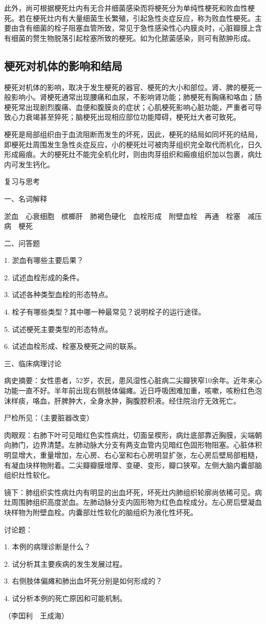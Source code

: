 此外，尚可根据梗死灶内有无合并细菌感染而将梗死分为单纯性梗死和败血性梗死。若在梗死灶内有大量细菌生长繁殖，引起急性炎症反应，称为败血性梗死。主要由含有细菌的栓子阻塞血管所致，常见于急性感染性心内膜炎时，心脏瓣膜上含有细菌的赘生物脱落引起栓塞所致的梗死。如为化脓菌感染，则可有脓肿形成。

\subsection{梗死对机体的影响和结局}

梗死对机体的影响，取决于发生梗死的器官、梗死的大小和部位。肾、脾的梗死一般影响小。肾梗死通常出现腰痛和血尿，不影响肾功能；肺梗死有胸痛和咯血；肠梗死常出现剧烈腹痛、血便和腹膜炎的症状；心肌梗死影响心脏功能，严重者可导致心力衰竭甚至猝死；脑梗死出现相应部位功能障碍，梗死灶大者可致死。

梗死是局部组织由于血流阻断而发生的坏死，因此，梗死的结局如同坏死的结局，即梗死灶周围发生急性炎症反应，小的梗死灶可被肉芽组织完全取代而机化，日久形成瘢痕。大的梗死灶不能完全机化时，则由肉芽组织和瘢痕组织加以包裹，病灶内可发生钙化。

{ { {复习与思考} } }

{一、名词解释}

淤血　心衰细胞　槟榔肝　肺褐色硬化　血栓形成　附壁血栓　再通　栓塞　减压病　梗死

{二、问答题}

1. 淤血有哪些主要后果？

2. 试述血栓形成的条件。

3. 试述各种类型血栓的形态特点。

4. 栓子有哪些类型？其中哪一种最常见？说明栓子的运行途径。

5. 试述梗死主要类型的形态特点。

6. 试述血栓形成、栓塞及梗死之间的联系。

{三、临床病理讨论}

病史摘要：女性患者，52岁，农民，患风湿性心脏病二尖瓣狭窄10余年。近年来心功能一直不好。半年前出现右侧肢体偏瘫。近日呼吸困难加重，咳嗽，咳粉红色泡沫样痰，咯血，肝脾肿大，全身水肿，胸腹腔积液。经住院治疗无效死亡。

尸检所见：（主要脏器改变）

肉眼观：右肺下叶可见暗红色实性病灶，切面呈楔形，病灶底部靠近胸膜，尖端朝向肺门，边界清楚。左肺动脉大分支有两支血管内见暗红色固形物阻塞。心脏体积明显增大，重量增加，左心房、右心室和右心房明显扩张，左心房后壁局部粗糙，有凝血块样物附着。二尖瓣瓣膜增厚、变硬、变形，瓣口狭窄。左侧大脑内囊部脑组织灶性软化。

镜下：肺组织实性病灶内有明显的出血坏死，坏死灶内肺组织轮廓尚依稀可见。病灶周围肺组织高度淤血。左肺动脉分支内固形物为红色血栓成分。左心房后壁凝血块样物为附壁血栓。内囊部灶性软化的脑组织为液化性坏死。

讨论题：

1. 本例的病理诊断是什么？

2. 试分析其主要疾病的发生发展过程。

3. 右侧肢体偏瘫和肺出血坏死分别是如何形成的？

4. 试分析本例的死亡原因和可能机制。

{（李囯利　王成海）}
